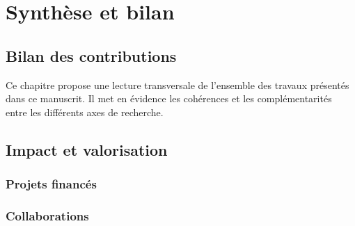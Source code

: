 
\chapter{Synthèse et bilan}
\label{ch:synthesis}


\section{Bilan des contributions}
\label{sec:synth:bilan}

Ce chapitre propose une lecture transversale de l'ensemble des travaux présentés dans
ce manuscrit. Il met en évidence les cohérences et les complémentarités entre les
différents axes de recherche.

\section{Impact et valorisation}
\label{sec:synth:impact}


\subsection{Projets financés}
\label{ssec:synth:projects}


\subsection{Collaborations}
\label{ssec:synth:collaborations}

